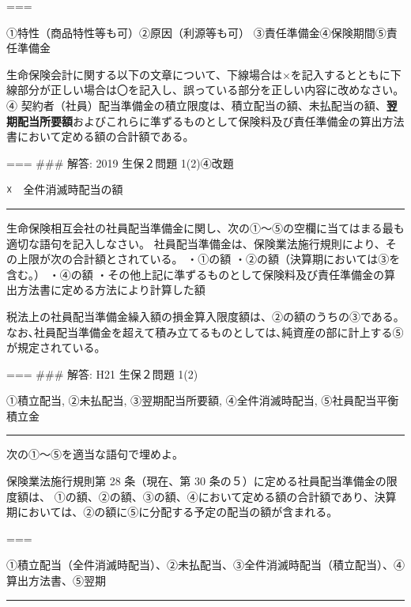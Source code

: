 \documentclass[report,gutter=10mm,fore-edge=10mm,uplatex,dvipdfmx]{jlreq}
\begin{document}
===


①特性（商品特性等も可）②原因（利源等も可）
③責任準備金④保険期間⑤責任準備金


生命保険会計に関する以下の文章について、下線場合は×を記入するとともに下線部分が正しい場合は〇を記入し、誤っている部分を正しい内容に改めなさい。
④
契約者（社員）配当準備金の積立限度は、積立配当の額、未払配当の額、\textbf{翌期配当所要額}およびこれらに準ずるものとして保険料及び責任準備金の算出方法書において定める額の合計額である。

=== \#\#\# 解答: 2019 生保２問題 1(2)④改題

☓　全件消滅時配当の額

\begin{center}\rule{0.5\linewidth}{0.5pt}\end{center}


生命保険相互会社の社員配当準備金に関し、次の①～⑤の空欄に当てはまる最も適切な語句を記入しなさい。
社員配当準備金は、保険業法施行規則により、その上限が次の合計額とされている。
・①の額 ・②の額（決算期においては③を含む｡） ・④の額
・その他上記に準ずるものとして保険料及び責任準備金の算出方法書に定める方法により計算した額

税法上の社員配当準備金繰入額の損金算入限度額は、②の額のうちの③である。
なお､社員配当準備金を超えて積み立てるものとしては､純資産の部に計上する⑤が規定されている。

=== \#\#\# 解答: H21 生保２問題 1(2)

①積立配当, ②未払配当, ③翌期配当所要額, ④全件消滅時配当,
⑤社員配当平衡積立金

\begin{center}\rule{0.5\linewidth}{0.5pt}\end{center}


次の①～⑤を適当な語句で埋めよ。

保険業法施行規則第 28 条（現在、第 30
条の５）に定める社員配当準備金の限度額は、
①の額、②の額、③の額、④において定める額の合計額であり、決算期においては、②の額に⑤に分配する予定の配当の額が含まれる。

===


①積立配当（全件消滅時配当）、②未払配当、③全件消滅時配当（積立配当）、④算出方法書、⑤翌期

\begin{center}\rule{0.5\linewidth}{0.5pt}\end{center}
\end{document}
